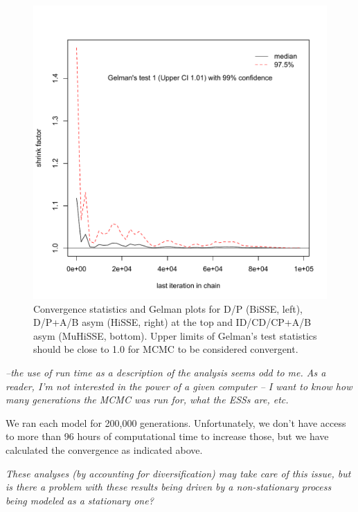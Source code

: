\documentclass[11pt]{article}
\renewenvironment{quote}{\bigskip\noindent\itshape\ignorespaces}{\smallskip}
\begin{document}
\begin{figure}
\begin{minipage}[b]{0.33\textwidth}
        \end{minipage}
    \begin{minipage}[b]{0.33\textwidth}
             \includegraphics[width=\textwidth]{Gelmanmuhissenodipasym.pdf}
                 \end{minipage}
    \caption{ Convergence statistics and Gelman plots for D/P (BiSSE, left), D/P+A/B asym (HiSSE, right) at the top and ID/CD/CP+A/B asym (MuHiSSE, bottom). Upper limits of Gelman's test statistics should be close to 1.0 for MCMC to be considered convergent.}
    \label{figure:convergencestats}
\end{figure}


\begin{quote}
--the use of run time as a description of the analysis seems odd to me.
As a reader, I'm not interested in the power of a given computer -- I want to know how many generations the MCMC was run for, what the ESSs are, etc.
\end{quote}

We ran each model for 200,000 generations. Unfortunately, we don't have access to more than 96 hours of computational time to increase those, but we have calculated the convergence as indicated above.


\begin{quote}
-325  These analyses (by accounting for diversification) may take care of this issue, but is there a problem with these results being driven by a non-stationary process being modeled as a stationary one?
\end{quote}
\end{document}
